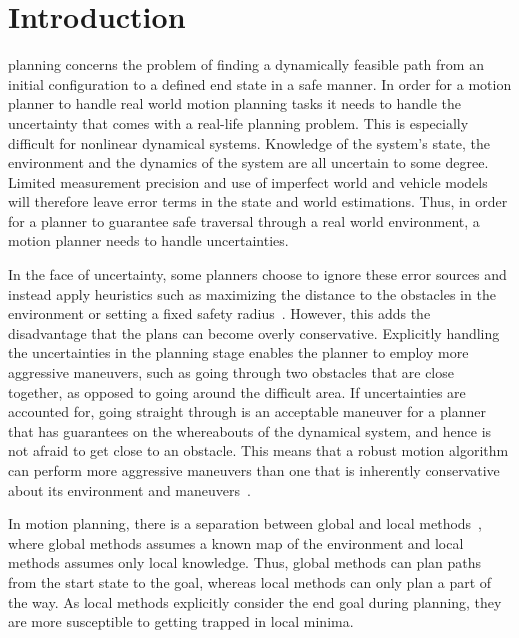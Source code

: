 
\section{Introduction}

 planning concerns the problem of finding a
dynamically feasible path from an initial configuration
to a defined end state in a safe manner. In order for a motion
planner to handle real world motion planning tasks it needs
to handle the uncertainty that comes with a real-life planning
problem. This is especially difficult for nonlinear dynamical
systems. Knowledge of the system’s state, the environment and
the dynamics of the system are all uncertain to some degree.
Limited measurement precision and use of imperfect world
and vehicle models will therefore leave error terms in the
state and world estimations. Thus, in order for a planner to
guarantee safe traversal through a real world environment, a
motion planner needs to handle uncertainties.


In the face of uncertainty, some planners choose to ignore these error sources
and instead apply heuristics such as maximizing the distance to the obstacles in
the environment or setting a fixed safety radius~\cite{hoyAlgorithmsCollisionfreeNavigation2015}. However, this adds the
disadvantage that the plans can become overly conservative. Explicitly handling
the uncertainties in the planning stage enables the planner to employ more
aggressive maneuvers, such as going through two obstacles that are close
together, as opposed to going around the difficult area. If uncertainties are
accounted for, going straight through is an acceptable maneuver for a planner
that has guarantees on the whereabouts of the dynamical system, and hence is not
afraid to get close to an obstacle. This means that a robust motion algorithm
can perform more aggressive maneuvers than one that is inherently conservative
about its environment and maneuvers~\cite{singhRobustOnlineMotion2017}.

In motion planning, there is a separation between global
and local methods~\cite{hoyAlgorithmsCollisionfreeNavigation2015}, where global methods assumes a known
map of the environment and local methods assumes only local
knowledge. Thus, global methods can plan paths from the start
state to the goal, whereas local methods can only plan a part
of the way. As local methods explicitly consider the end goal
during planning, they are more susceptible to getting trapped
in local minima.

